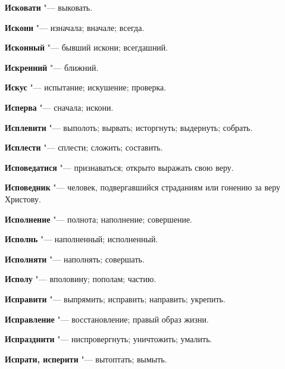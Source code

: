 \begin{mymulticols}{2}
\noindent\textbf{Исковати} "--- выковать. 




\noindent\textbf{Искони} "--- изначала; вначале; всегда. 




\noindent\textbf{Исконный} "--- бывший искони; всегдашний. 




\noindent\textbf{Искренний} "--- ближний. 




\noindent\textbf{Искус} "--- испытание; искушение; проверка. 




\noindent\textbf{Исперва} "--- сначала; искони. 




\noindent\textbf{Исплевити} "--- выполоть; вырвать; исторгнуть; выдернуть; собрать. 




\noindent\textbf{Исплести} "--- сплести; сложить; составить. 




\noindent\textbf{Исповедатися} "--- признаваться; открыто выражать свою веру. 




\noindent\textbf{Исповедник} "--- человек, подвергавшийся страданиям или гонению за веру Христову. 




\noindent\textbf{Исполнение} "--- полнота; наполнение; совершение. 




\noindent\textbf{Исполнь} "--- наполненный; исполненный. 




\noindent\textbf{Исполняти} "--- наполнять; совершать. 




\noindent\textbf{Исполу} "--- вполовину; пополам; частию. 




\noindent\textbf{Исправити} "--- выпрямить; исправить; направить; укрепить. 




\noindent\textbf{Исправление} "--- восстановление; правый образ жизни. 




\noindent\textbf{Испразднити} "--- ниспровергнуть; уничтожить; умалить. 




\noindent\textbf{Испрати, исперити} "--- вытоптать; вымыть. 





\end{mymulticols}
